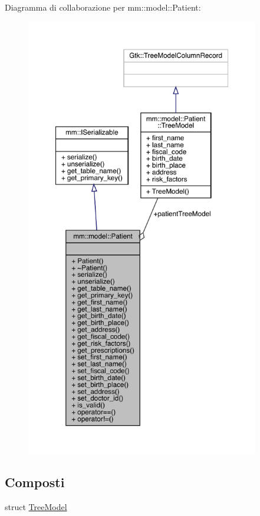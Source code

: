 Diagramma di collaborazione per mm\+:\+:model\+:\+:Patient\+:
\nopagebreak
\begin{figure}[H]
\begin{center}
\leavevmode
\includegraphics[height=550pt]{dc/d82/classmm_1_1model_1_1_patient__coll__graph}
\end{center}
\end{figure}
\subsection*{Composti}
\begin{DoxyCompactItemize}
\item 
struct \mbox{\hyperlink{structmm_1_1model_1_1_patient_1_1_tree_model}{Tree\+Model}}
\end{DoxyCompactItemize}
